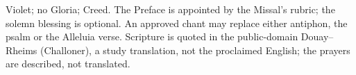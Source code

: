
\vspace{0.1em}
{\footnotesize\noindent Violet; no Gloria; Creed. The Preface is appointed by
the Missal's rubric; the solemn blessing is optional. An approved chant may
replace either antiphon, the psalm or the Alleluia verse. Scripture is quoted in
the public-domain Douay--Rheims (Challoner), a study translation, not the
proclaimed English; the prayers are described, not translated.\par}
